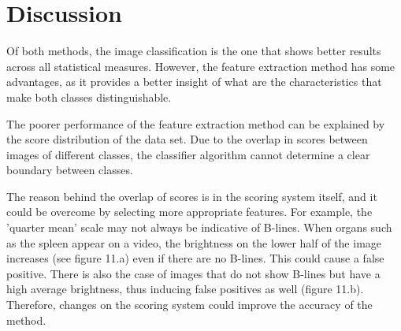 \documentclass[11pt]{article} %
\begin{document}
\section{Discussion}
	Of both methods, the image classification is the one that shows better results across all statistical measures. However, the feature extraction method has some advantages, as it provides a better insight of what are the characteristics that make both classes distinguishable. 
	
	The poorer performance of the feature extraction method can be explained by the score distribution of the data set. Due to the overlap in scores between images of different classes, the classifier algorithm cannot determine a clear boundary between classes.
	
	The reason behind the overlap of scores is in the scoring system itself, and it could be overcome by selecting more appropriate features. For example, the 'quarter mean' scale may not always be indicative of B-lines. When organs such as the spleen appear on a video, the brightness on the lower half of the image increases (see figure 11.a) even if there are no B-lines. This could cause a false positive. There is also the case of images that do not show B-lines but have a high average brightness, thus inducing false positives as well (figure 11.b).  Therefore, changes on the scoring system could improve the accuracy of the method.
	
\end{document}
